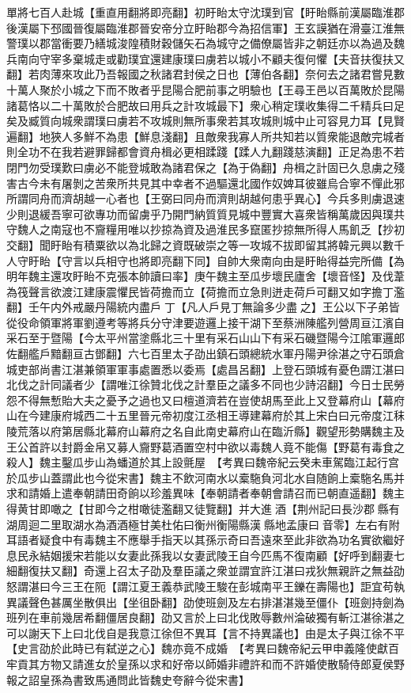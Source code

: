 單將七百人赴城【重直用翻將即亮翻】初盱眙太守沈璞到官【盱眙縣前漢屬臨淮郡後漢屬下邳國晉復屬臨淮郡晉安帝分立盱眙郡今為招信軍】王玄謨猶在滑臺江淮無警璞以郡當衝要乃繕城浚隍積財穀儲矢石為城守之備僚屬皆非之朝廷亦以為過及魏兵南向守宰多棄城走或勸璞宜還建康璞曰虜若以城小不顧夫復何懼【夫音扶復扶又翻】若肉薄來攻此乃吾報國之秋諸君封侯之日也【薄伯各翻】奈何去之諸君嘗見數十萬人聚於小城之下而不敗者乎昆陽合肥前事之明驗也【王尋王邑以百萬敗於昆陽諸葛恪以二十萬敗於合肥故曰用兵之計攻城最下】衆心稍定璞收集得二千精兵曰足矣及臧質向城衆謂璞曰虜若不攻城則無所事衆若其攻城則城中止可容見力耳【見賢遍翻】地狹人多鮮不為患【鮮息淺翻】且敵衆我寡人所共知若以質衆能退敵完城者則全功不在我若避罪歸都會資舟楫必更相蹂踐【蹂人九翻踐慈演翻】正足為患不若閉門勿受璞歎曰虜必不能登城敢為諸君保之【為于偽翻】舟楫之計固已久息虜之殘害古今未有屠剝之苦衆所共見其中幸者不過驅還北國作奴婢耳彼雖烏合寧不憚此邪所謂同舟而濟胡越一心者也【王弼曰同舟而濟則胡越何患乎異心】今兵多則虜退速少則退緩吾寧可欲專功而留虜乎乃開門納質質見城中豐實大喜衆皆稱萬歲因與璞共守魏人之南寇也不齎糧用唯以抄掠為資及過淮民多竄匿抄掠無所得人馬飢乏【抄初交翻】聞盱眙有積粟欲以為北歸之資既破崇之等一攻城不拔即留其將韓元興以數千人守盱眙【守言以兵相守也將即亮翻下同】自帥大衆南向由是盱眙得益完所備【為明年魏主還攻盱眙不克張本帥讀曰率】庚午魏主至瓜步壞民廬舍【壞音怪】及伐葦為筏聲言欲渡江建康震懼民皆荷擔而立【荷擔而立急則迸走荷戶可翻又如字擔丁濫翻】壬午内外戒嚴丹陽統内盡戶丁【凡人戶見丁無論多少盡之】王公以下子弟皆從役命領軍將軍劉遵考等將兵分守津要遊邏上接干湖下至蔡洲陳艦列營周亘江濱自采石至于暨陽【今太平州當塗縣北三十里有采石山山下有采石磯暨陽今江隂軍邏郎佐翻艦戶黯翻亘古鄧翻】六七百里太子劭出鎮石頭總統水軍丹陽尹徐湛之守石頭倉城吏部尚書江湛兼領軍軍事處置悉以委焉【處昌呂翻】上登石頭城有憂色謂江湛曰北伐之計同議者少【謂唯江徐贊北伐之計羣臣之議多不同也少詩沼翻】今日士民勞怨不得無慙貽大夫之憂予之過也又曰檀道濟若在豈使胡馬至此上又登幕府山【幕府山在今建康府城西二十五里晉元帝初度江丞相王導建幕府於其上宋白曰元帝度江秣陵荒落以府第居縣北幕府山幕府之名自此南史幕府山在臨沂縣】觀望形勢購魏主及王公首許以封爵金帛又募人齎野葛酒置空村中欲以毒魏人竟不能傷【野葛有毒食之殺人】魏主鑿瓜步山為蟠道於其上設氈屋　【考異曰魏帝紀云癸未車駕臨江起行宫於瓜步山蓋謂此也今從宋書】魏主不飲河南水以槖駞負河北水自随餉上槖駞名馬并求和請婚上遣奉朝請田奇餉以珍羞異味【奉朝請者奉朝會請召而已朝直遥翻】魏主得黄甘即噉之【甘即今之柑噉徒濫翻又徒覽翻】并大進酒【荆州記曰長沙郡縣有湖周迴二里取湖水為酒酒極甘美杜佑曰衡州衡陽縣漢縣地孟康曰音零】左右有附耳語者疑食中有毒魏主不應舉手指天以其孫示奇曰吾遠來至此非欲為功名實欲繼好息民永結姻援宋若能以女妻此孫我以女妻武陵王自今匹馬不復南顧【好呼到翻妻七細翻復扶又翻】奇還上召太子劭及羣臣議之衆並謂宜許江湛曰戎狄無親許之無益劭怒謂湛曰今三王在阨【謂江夏王義恭武陵王駿在彭城南平王鑠在壽陽也】詎宜苟執異議聲色甚厲坐散俱出【坐徂卧翻】劭使班劍及左右排湛湛幾至僵仆【班劍持劍為班列在車前幾居希翻僵居良翻】劭又言於上曰北伐敗辱數州淪破獨有斬江湛徐湛之可以謝天下上曰北伐自是我意江徐但不異耳【言不持異議也】由是太子與江徐不平【史言劭於此時已有弑逆之心】魏亦竟不成婚　【考異曰魏帝紀云甲申義隆使獻百牢貢其方物又請進女於皇孫以求和好帝以師婚非禮許和而不許婚使散騎侍郎夏侯野報之詔皇孫為書致馬通問此皆魏史夸辭今從宋書】

